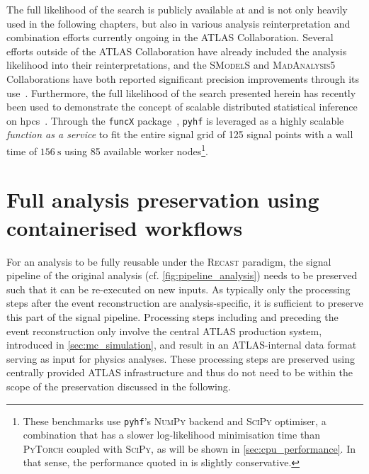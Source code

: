 The full likelihood of the \onelepton search is publicly available at \cite{fullLH_1Lbb} and is not only heavily used in the following chapters, but also in various analysis reinterpretation and combination efforts currently ongoing in the ATLAS Collaboration.
Several efforts outside of the ATLAS Collaboration have already included the analysis likelihood into their reinterpretations, and the \textsc{SModelS} and \textsc{MadAnalysis5} Collaborations have both reported significant precision improvements through its use~\cite{SModelS_pyhf:2020grj,Goodsell:2020ddr,Fuks:2021wpe}. Furthermore, the full likelihood of the search presented herein has recently been used to demonstrate the concept of scalable distributed statistical inference on \glspl{hpc}~\cite{Feickert:2021sua}.
Through the \texttt{funcX} package~\cite{chard20funcx}, \texttt{pyhf} is leveraged as a highly scalable \textit{function as a service} to fit the entire \onelepton signal grid of 125 signal points with a wall time of $\SI{156}{\second}$ using 85 available worker nodes\footnote{These benchmarks use \texttt{pyhf}'s \textsc{NumPy} backend and \textsc{SciPy} optimiser, a combination that has a slower log-likelihood minimisation time than \eg \textsc{PyTorch} coupled with \textsc{SciPy}, as will be shown in \cref{sec:cpu_performance}. In that sense, the performance quoted in \cite{Feickert:2021sua} is slightly conservative.}.

\section{Full analysis preservation using containerised workflows}\label{sec:recast_implementation}

For an analysis to be fully reusable under the \textsc{Recast} paradigm, the signal pipeline of the original analysis (cf. \cref{fig:pipeline_analysis}) needs to be preserved such that it can be re-executed on new inputs.
As typically only the processing steps after the event reconstruction are analysis-specific, it is sufficient to preserve this part of the signal pipeline.
Processing steps including and preceding the event reconstruction only involve the central ATLAS production system, introduced in \cref{sec:mc_simulation}, and result in an ATLAS-internal data format serving as input for physics analyses. These processing steps are preserved using centrally provided ATLAS infrastructure and thus do not need to be within the scope of the preservation discussed in the following.

